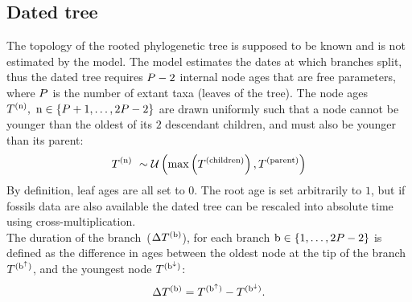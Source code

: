 \subsection{Dated tree}
The topology of the rooted phylogenetic tree is supposed to be known and is not estimated by the model.
The model estimates the dates at which branches split, thus the dated tree requires $P - 2$ internal node ages that are free parameters, where $P$ is the number of extant taxa (leaves of the tree).
The node ages $T^{(\text{n})},\ \text{n} \in \{P + 1, \hdots, 2 P - 2\}$ are drawn uniformly such that a node cannot be younger than the oldest of its $2$ descendant children, and must also be younger than its parent:
\begin{equation}
    \label{eq:Distribage}
    \age\nodeexp \ \sim \mathcal{U}\left( \mathrm{max}\left(\age^{(\mathrm{children})} \right), \age^{(\mathrm{parent})} \right)
\end{equation}
By definition, leaf ages are all set to $0$. The root age is set arbitrarily to $1$, but if fossils data are also available the dated tree can be rescaled into absolute time using cross-multiplication.\\
The duration of the branch~($\Delta T^{(\text{b})}$), for each branch $\text{b} \in \{1, \hdots, 2 P - 2\}$ is defined as the difference in ages between the oldest node at the tip of the branch $T^{(\text{b}^{\uparrow})}$, and the youngest node $T^{(\text{b}^{\downarrow})}$:
\begin{equation}
    \label{eq:ageTobranchtime}
    \branchtime\branchexp = \age^{(\nodeUp)} - \age^{(\nodeDown)}.
\end{equation}

